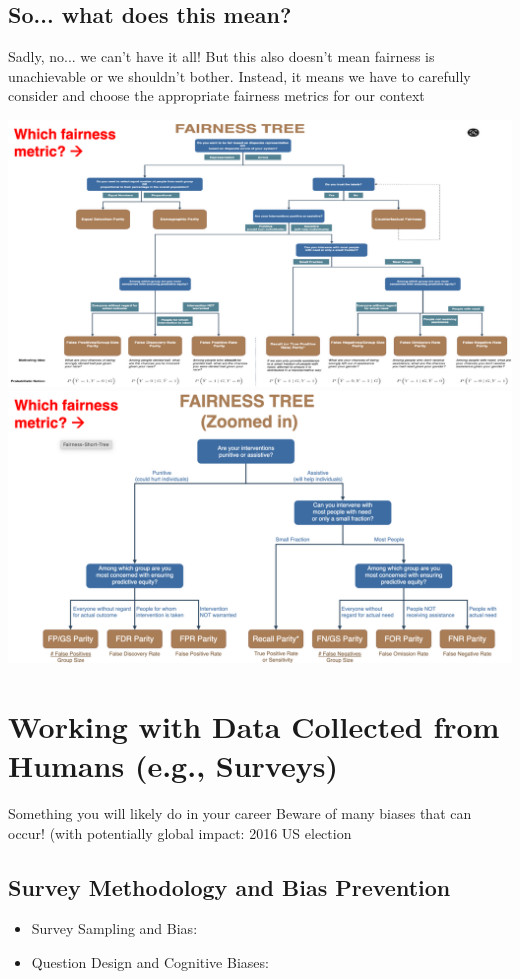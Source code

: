\documentclass[11pt]{article}
\theoremstyle{definition}
\begin{document}
\subsection{So... what does this mean?}
Sadly, no... we can’t have it all!
But this also doesn’t mean fairness is unachievable or
we shouldn’t bother.
Instead, it means we have to carefully consider and
choose the appropriate fairness metrics for our
context

\includegraphics[width=\textwidth]{11.png}
\includegraphics[width=\textwidth]{12.png}

\section{Working with Data Collected from
Humans (e.g., Surveys)}
Something you will likely do in your career
Beware of many biases that can occur!
(with potentially global impact: 2016 US election

\subsection{Survey Methodology and Bias Prevention}
\begin{itemize}
    \item Survey Sampling and Bias:
    \item Question Design and Cognitive Biases:
\end{itemize}
\end{document}

